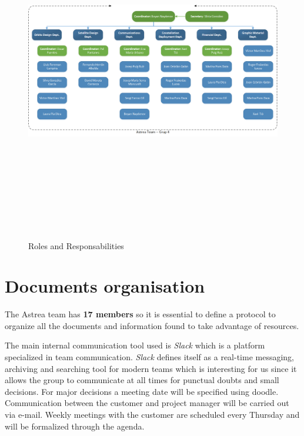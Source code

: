 \begin{figure}[H]
\centering
\includegraphics[width=15cm,height=15cm,keepaspectratio]{organigram-team.png}
\caption{Roles and Responsabilities}
\end{figure}
\section{Documents organisation}


The Astrea team has \textbf{17 members} so it is essential to define a protocol to organize all the documents and information found to take advantage of resources. 
\newline

The main internal communication tool used is \textit{Slack} which is a platform specialized in team communication. \textit{Slack} defines itself as a real-time messaging, archiving and searching tool for modern teams which is interesting for us since it allows the group to communicate at all times for punctual doubts and small decisions. For major decisions a meeting date will be specified using doodle. Communication between the customer and project manager will be carried out via e-mail. Weekly meetings with the customer are scheduled every Thursday and will be formalized through the agenda.
 \newline

